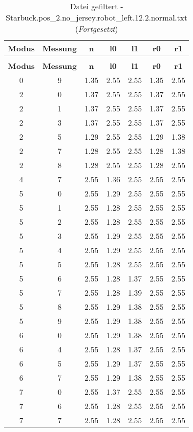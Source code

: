 \begin{longtable}{|c|c||c||c|c||c|c|}
	\caption{Datei gefiltert - Starbuck.pos\_2.no\_jersey.robot\_left.12.2.normal.txt} \label{tab:Starbuck.pos-2.no-jersey.robot-left.12.2.normal.txt} \\ \hline
	\textbf{Modus} & \textbf{Messung} & \textbf{n} & \textbf{l0} & \textbf{l1} & \textbf{r0} & \textbf{r1}\\ \hline
	\endfirsthead
	\caption[]{Datei gefiltert - Starbuck.pos\_2.no\_jersey.robot\_left.12.2.normal.txt (\emph{Fortgesetzt})} \\ \hline
	\textbf{Modus} & \textbf{Messung} & \textbf{n} & \textbf{l0} & \textbf{l1} & \textbf{r0} & \textbf{r1}\\ \hline
	\endhead
	0 & 9 & 1.35 & 2.55 & 2.55 & 1.35 & 2.55 \\ \hline
	2 & 0 & 1.37 & 2.55 & 2.55 & 1.37 & 2.55 \\ \hline
	2 & 1 & 1.37 & 2.55 & 2.55 & 1.37 & 2.55 \\ \hline
	2 & 3 & 1.37 & 2.55 & 2.55 & 1.37 & 2.55 \\ \hline
	2 & 5 & 1.29 & 2.55 & 2.55 & 1.29 & 1.38 \\ \hline
	2 & 7 & 1.28 & 2.55 & 2.55 & 1.28 & 1.38 \\ \hline
	2 & 8 & 1.28 & 2.55 & 2.55 & 1.28 & 2.55 \\ \hline
	4 & 7 & 2.55 & 1.36 & 2.55 & 2.55 & 2.55 \\ \hline
	5 & 0 & 2.55 & 1.29 & 2.55 & 2.55 & 2.55 \\ \hline
	5 & 1 & 2.55 & 1.28 & 2.55 & 2.55 & 2.55 \\ \hline
	5 & 2 & 2.55 & 1.28 & 2.55 & 2.55 & 2.55 \\ \hline
	5 & 3 & 2.55 & 1.29 & 2.55 & 2.55 & 2.55 \\ \hline
	5 & 4 & 2.55 & 1.29 & 2.55 & 2.55 & 2.55 \\ \hline
	5 & 5 & 2.55 & 1.28 & 2.55 & 2.55 & 2.55 \\ \hline
	5 & 6 & 2.55 & 1.28 & 1.37 & 2.55 & 2.55 \\ \hline
	5 & 7 & 2.55 & 1.28 & 1.39 & 2.55 & 2.55 \\ \hline
	5 & 8 & 2.55 & 1.29 & 1.38 & 2.55 & 2.55 \\ \hline
	5 & 9 & 2.55 & 1.29 & 1.38 & 2.55 & 2.55 \\ \hline
	6 & 0 & 2.55 & 1.29 & 1.38 & 2.55 & 2.55 \\ \hline
	6 & 4 & 2.55 & 1.28 & 1.37 & 2.55 & 2.55 \\ \hline
	6 & 5 & 2.55 & 1.29 & 1.37 & 2.55 & 2.55 \\ \hline
	6 & 7 & 2.55 & 1.29 & 1.38 & 2.55 & 2.55 \\ \hline
	7 & 0 & 2.55 & 1.37 & 2.55 & 2.55 & 2.55 \\ \hline
	7 & 6 & 2.55 & 1.28 & 2.55 & 2.55 & 2.55 \\ \hline
	7 & 7 & 2.55 & 1.28 & 2.55 & 2.55 & 2.55 \\ \hline
\end{longtable}
